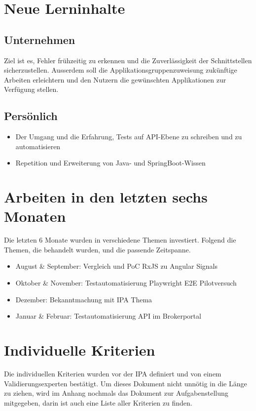 \section{Neue Lerninhalte}
\subsection{Unternehmen}
Ziel ist es, Fehler frühzeitig zu erkennen und die Zuverlässigkeit der Schnittstellen sicherzustellen.
Ausserdem soll die Applikationsgruppenzuweisung zukünftige Arbeiten erleichtern und den Nutzern
die gewünschten Applikationen zur Verfügung stellen.

\subsection{Persönlich}
\begin{itemize}
    \item Der Umgang und die Erfahrung, Tests auf API-Ebene zu schreiben und zu automatisieren
    \item Repetition und Erweiterung von Java- und SpringBoot-Wissen
\end{itemize}

\section{Arbeiten in den letzten sechs Monaten}
Die letzten 6 Monate wurden in verschiedene Themen investiert. Folgend die Themen, die behandelt wurden, und die passende Zeitspanne.
\begin{itemize}
    \item August \& September: Vergleich und PoC RxJS zu Angular Signals
    \item Oktober \& November: Testautomatisierung Playwright E2E Pilotversuch
    \item Dezember: Bekanntmachung mit IPA Thema
    \item Januar \& Februar: Testautomatisierung API im Brokerportal
\end{itemize}

\section{Individuelle Kriterien}
Die individuellen Kriterien wurden vor der IPA definiert und von einem Validierungsexperten bestätigt. Um dieses Dokument nicht unnötig in die Länge zu ziehen, wird im Anhang nochmals das Dokument zur Aufgabenstellung mitgegeben, darin ist auch eine Liste aller Kriterien zu finden. 